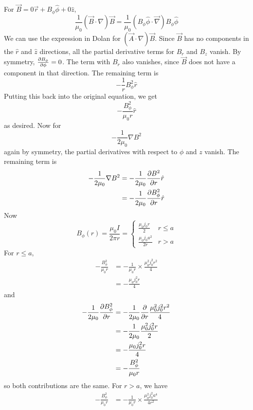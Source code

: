 \documentclass[answers]{exam}
\begin{document}
\begin{questions}
\begin{solution}
    For $\vec B = 0\vec r + B_\phi\hat \phi + 0\hat z$,
    $$\frac{1}{\mu_0} (\vec B \cdot \nabla)\vec B = \frac{1}{\mu_0} (B_\phi\hat \phi \cdot \vec \nabla) B_\phi \hat\phi$$
    We can use the expression in Dolan for $(\vec A \cdot \nabla)\vec B$. Since $\vec B$ has no components in the $\hat r$ and $\hat z$ directions, all the partial derivative terms for $B_r$ and $B_z$ vanish. By symmetry, $\frac{\partial B_\phi}{\partial \phi} = 0$. The term with $B_r$ also vanishes, since $\vec B$ does not have a component in that direction. The remaining term is
    $$-\frac{1}{r} B_\phi^2\hat r$$
    Putting this back into the original equation, we get
    $$-\frac{B^2_\phi}{\mu_0r}\hat r$$
    as desired. Now for
    $$-\frac{1}{2\mu_0}\nabla B^2$$
    again by symmetry, the partial derivatives with respect to $\phi$ and $z$ vanish. The remaining term is
    \begin{align*}
        -\frac{1}{2\mu_0}\nabla B^2 &= -\frac{1}{2\mu_0} \frac{\partial B^2}{\partial r} \hat r \\
                                    &= -\frac{1}{2\mu_0} \frac{\partial B_\phi^2}{\partial r} \hat r
    \end{align*}
    Now
    $$B_\phi(r) = \frac{\mu_0I}{2\pi r} = \begin{cases} \frac{\mu_0j_0r}{2} & r \leq a \\ \frac{\mu_0j_0a^2}{2r} & r > a \end{cases}$$
    For $r\leq a$,
    \begin{align*}
        -\frac{B_\phi^2}{\mu_0r} &= -\frac{1}{\mu_0r} \times \frac{\mu_0^2j_0^2r^2}{4} \\
                                 &= -\frac{\mu_0j_0^2r}{4}
    \end{align*}
    and
    \begin{align*}
        -\frac{1}{2\mu_0} \frac{\partial B_\phi^2}{\partial r} &= -\frac{1}{2\mu_0} \frac{\partial }{\partial r} \frac{\mu_0^2j_0^2r^2}{4} \\
                                            &= -\frac{1}{2\mu_0} \frac{\mu_0^2j_0^2r}{2} \\
                                            &= -\frac{\mu_0j_0^2r}{4} \\
                                            &= -\frac{B_\phi^2}{\mu_0r}
    \end{align*}
    so both contributions are the same. For $r > a$, we have
    \begin{align*}
        -\frac{B_\phi^2}{\mu_0r} &= -\frac{1}{\mu_0r} \times \frac{\mu_0^2j_0^2a^4}{4r^2} \\

\end{align*}
\end{solution}
\end{questions}
\end{document}
